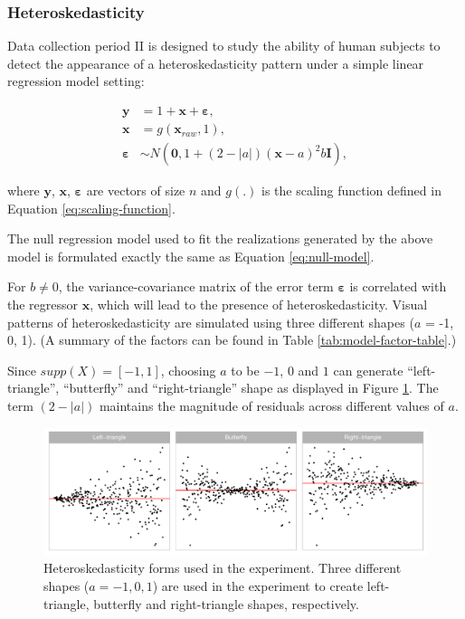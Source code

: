 \documentclass[]{interact}
\theoremstyle{plain}%
\theoremstyle{definition}
\theoremstyle{remark}
\begin{document}
\hypertarget{heteroskedasticity}{%
\subsubsection{Heteroskedasticity}\label{heteroskedasticity}}

Data collection period II is designed to study the ability of human
subjects to detect the appearance of a heteroskedasticity pattern under
a simple linear regression model setting:

\begin{align} \label{eq:heter-model}
\boldsymbol{y} &= 1 + \boldsymbol{x} + \boldsymbol{\varepsilon},\\
\boldsymbol{x} &= g(\boldsymbol{x}_{raw}, 1),\\
\boldsymbol{\varepsilon} &\sim N(\boldsymbol{0}, 1 + (2 - |a|)(\boldsymbol{x} - a)^2b \boldsymbol{I}), 
\end{align}

\noindent where \(\boldsymbol{y}\), \(\boldsymbol{x}\),
\(\boldsymbol{\varepsilon}\) are vectors of size \(n\) and \(g(.)\) is
the scaling function defined in Equation \ref{eq:scaling-function}.

The null regression model used to fit the realizations generated by the
above model is formulated exactly the same as Equation
\ref{eq:null-model}.

For \(b \neq 0\), the variance-covariance matrix of the error term
\(\boldsymbol{\varepsilon}\) is correlated with the regressor
\(\boldsymbol{x}\), which will lead to the presence of
heteroskedasticity. Visual patterns of heteroskedasticity are simulated
using three different shapes (\(a\) = -1, 0, 1). (A summary of the
factors can be found in Table \ref{tab:model-factor-table}.)

Since \(supp(X) = [-1, 1]\), choosing \(a\) to be \(-1\), \(0\) and
\(1\) can generate ``left-triangle'', ``butterfly'' and
``right-triangle'' shape as displayed in Figure
\ref{fig:different-shape-of-heter}. The term \((2 - |a|)\) maintains the
magnitude of residuals across different values of \(a\).

\begin{figure}

{\centering \includegraphics[width=1\linewidth]{paper_comparison_files/figure-latex/different-shape-of-heter-1} 

}

\caption{Heteroskedasticity forms used in the experiment. Three different shapes ($a = -1, 0, 1$) are used in the experiment to create left-triangle, butterfly and right-triangle shapes, respectively.}\label{fig:different-shape-of-heter}
\end{figure}
\end{document}
